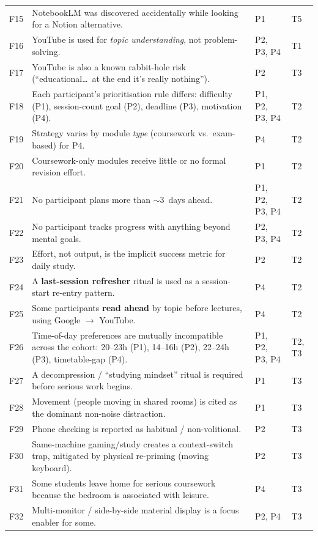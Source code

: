 \documentclass[a4paper,11pt]{article}
\begin{document}
\begin{longtable}{@{}>{\raggedright\arraybackslash}p{0.8cm}>{\raggedright\arraybackslash}p{10.4cm}>{\raggedright\arraybackslash}p{2.6cm}>{\raggedright\arraybackslash}p{1.5cm}@{}}
F15 & NotebookLM was discovered accidentally while looking for a Notion alternative. & P1 & T5 \\
F16 & YouTube is used for \emph{topic understanding}, not problem-solving. & P2, P3, P4 & T1 \\
F17 & YouTube is also a known rabbit-hole risk (``educational\dots\ at the end it's really nothing''). & P2 & T3 \\
F18 & Each participant's prioritisation rule differs: difficulty (P1), session-count goal (P2), deadline (P3), motivation (P4). & P1, P2, P3, P4 & T2 \\
F19 & Strategy varies by module \emph{type} (coursework vs.\ exam-based) for P4. & P4 & T2 \\
F20 & Coursework-only modules receive little or no formal revision effort. & P1 & T2 \\
F21 & No participant plans more than ${\sim}3$~days ahead. & P1, P2, P3, P4 & T2 \\
F22 & No participant tracks progress with anything beyond mental goals. & P2, P3, P4 & T2 \\
F23 & Effort, not output, is the implicit success metric for daily study. & P2 & T2 \\
F24 & A \textbf{last-session refresher} ritual is used as a session-start re-entry pattern. & P4 & T2 \\
F25 & Some participants \textbf{read ahead} by topic before lectures, using Google $\rightarrow$ YouTube. & P4 & T2 \\
F26 & Time-of-day preferences are mutually incompatible across the cohort: 20--23h (P1), 14--16h (P2), 22--24h (P3), timetable-gap (P4). & P1, P2, P3, P4 & T2, T3 \\
F27 & A decompression / ``studying mindset'' ritual is required before serious work begins. & P1 & T3 \\
F28 & Movement (people moving in shared rooms) is cited as the dominant non-noise distraction. & P1 & T3 \\
F29 & Phone checking is reported as habitual / non-volitional. & P2 & T3 \\
F30 & Same-machine gaming/study creates a context-switch trap, mitigated by physical re-priming (moving keyboard). & P2 & T3 \\
F31 & Some students leave home for serious coursework because the bedroom is associated with leisure. & P4 & T3 \\
F32 & Multi-monitor / side-by-side material display is a focus enabler for some. & P2, P4 & T3 \\

\end{longtable}
\end{document}
